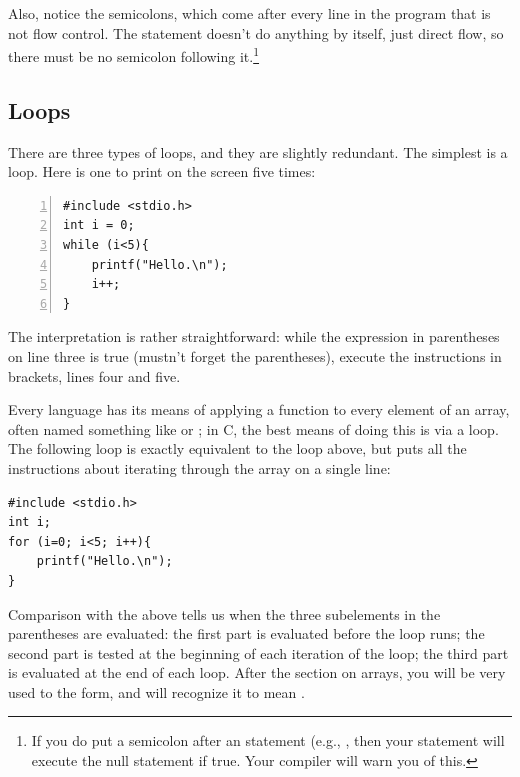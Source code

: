 Also, notice the semicolons, which come after every line in the program
that is not flow control. The  statement doesn't do
anything by itself, just direct flow, so there must be no semicolon
following it.\footnote{If you do put a semicolon after an 
statement (e.g., , then your  statement will
execute the null statement  if true. Your compiler
will warn you of this.}


\subsection{Loops} There are three types of loops, and they are slightly
redundant. The simplest is a  loop. Here is one to print 
on the screen five times: 

 
\begin{lstlisting}[numbers=left, numberstyle=\scshape]
#include <stdio.h>
int i = 0;
while (i<5){
    printf("Hello.\n");
    i++;
}
\end{lstlisting}

The interpretation is rather straightforward: while the expression
in parentheses on line three is true (mustn't forget the parentheses), execute the
instructions in brackets, lines four and five.

Every language has its means of applying a function to every element of
an array, often named something like  or ; in C, the
best means of doing this is via a  loop.  The following 
loop is exactly equivalent to the  loop above, but puts all
the instructions about iterating through the array on a single line:

\begin{lstlisting}
#include <stdio.h>
int i;
for (i=0; i<5; i++){
    printf("Hello.\n");
}
\end{lstlisting}

Comparison with the above tells us when the three subelements in the
parentheses are evaluated: the first part is evaluated before the
loop runs; the second part is tested at the beginning of each
iteration of the loop; the third part is evaluated at the end of each
loop. After the section on arrays, you will be very used to the 
 form, and will recognize it to mean .

